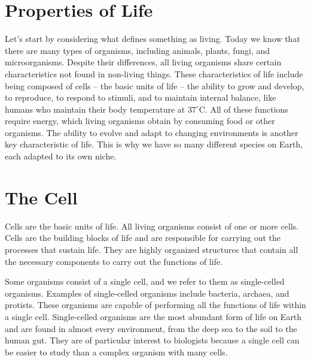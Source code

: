 \section{Properties of Life}

Let's start by considering what defines something as living. Today we know that there are many types of organisms, including animals, plants, fungi, and microorganisms. Despite their differences, all living organisms share certain characteristics not found in non-living things. These characteristics of life include being composed of cells -- the basic units of life -- the ability to grow and develop, to reproduce, to respond to stimuli, and to maintain internal balance, like humans who maintain their body temperature at \(37^\circ\mathrm{C}\). All of these functions require energy, which living organisms obtain by consuming food or other organisms. The ability to evolve and adapt to changing environments is another key characteristic of life. This is why we have so many different species on Earth, each adapted to its own niche.

\section{The Cell}

Cells are the basic units of life.
\reversemarginpar
{}
\normalmarginpar
All living organisms consist of one or more cells. Cells are the building blocks of life and are responsible for carrying out the processes that sustain life. They are highly organized structures that contain all the necessary components to carry out the functions of life. 

Some organisms consist of a single cell, and we refer to them as single-celled organisms. Examples of single-celled organisms include bacteria, archaea, and protists. These organisms are capable of performing all the functions of life within a single cell. Single-celled organisms are the most abundant form of life on Earth and are found in almost every environment, from the deep sea to the soil to the human gut. They are of particular interest to biologists because a single cell can be easier to study than a complex organism with many cells. 

